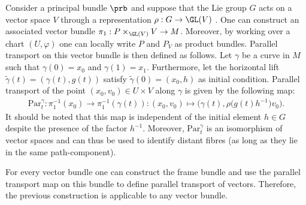 
    \begin{example}
        Consider a principal bundle $\prb$ and suppose that the Lie group $G$ acts on a vector space $V$ through a representation $\rho:G\rightarrow\GL(V)$ . One can construct an associated vector bundle $\pi_1:P\times_{\GL(V)} V\rightarrow M$. Moreover, by working over a chart $(U,\varphi)$ one can locally write $P$ and $P_V$ as product bundles. Parallel transport on this vector bundle is then defined as follows. Let $\gamma$ be a curve in $M$ such that $\gamma(0)=x_0$ and $\gamma(1)=x_1$. Furthermore, let the horizontal lift $\widetilde{\gamma}(t) = (\gamma(t),g(t))$ satisfy $\widetilde{\gamma}(0)=(x_0,h)$ as initial condition. Parallel transport of the point $(x_0,v_0)\in U\times V$ along $\gamma$ is given by the following map:
        \begin{gather}
            \mathrm{Par}^\gamma_t:\pi^{-1}_1(x_0)\rightarrow\pi^{-1}_1(\gamma(t)):(x_0, v_0)\mapsto\big(\gamma(t),\rho\big(g(t)h^{-1}\big)v_0\big).
        \end{gather}
        It should be noted that this map is independent of the initial element $h\in G$ despite the presence of the factor $h^{-1}$. Moreover, $\mathrm{Par}^\gamma_t$ is an isomorphism of vector spaces and can thus be used to identify distant fibres (as long as they lie in the same path-component).
    \end{example}
    \begin{remark}
        For every vector bundle one can construct the frame bundle and use the parallel transport map on this bundle to define parallel transport of vectors. Therefore, the previous construction is applicable to any vector bundle.
    \end{remark}

